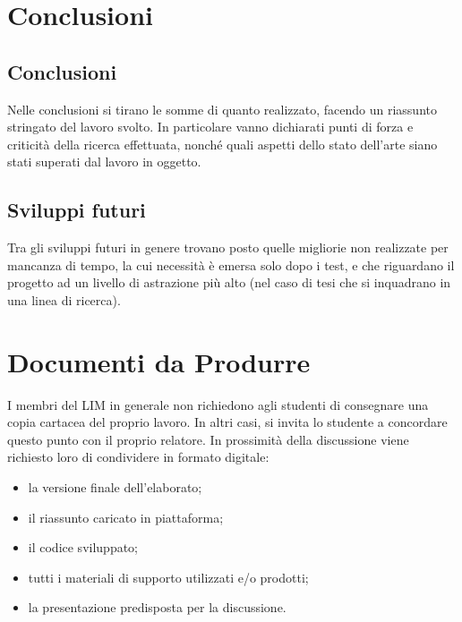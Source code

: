 \documentclass[12pt]{report}
\begin{document}
    \chapter{Conclusioni}
    \label{cap6}


    \section{Conclusioni}

    Nelle conclusioni si tirano le somme di quanto realizzato, facendo un riassunto stringato del lavoro svolto. In particolare vanno dichiarati punti di forza e criticità della ricerca effettuata, nonché quali aspetti dello stato dell'arte siano stati superati dal lavoro in oggetto.


    \section{Sviluppi futuri}

    Tra gli sviluppi futuri in genere trovano posto quelle migliorie non realizzate per mancanza di tempo, la cui necessità è emersa solo dopo i test, e che riguardano il progetto ad un livello di astrazione più alto (nel caso di tesi che si inquadrano in una linea di ricerca).


%
%

    \appendix


    \chapter{Documenti da Produrre}
    I membri del LIM in generale non richiedono agli studenti di consegnare una copia cartacea del proprio lavoro. In altri casi, si invita lo studente a concordare questo punto con il proprio relatore.
    In prossimità della discussione viene richiesto loro di condividere in formato digitale:
    \begin{itemize}
        \item la versione finale dell'elaborato;
        \item il riassunto caricato in piattaforma;
        \item il codice sviluppato;
        \item tutti i materiali di supporto utilizzati e/o prodotti;
        \item la presentazione predisposta per la discussione.
    \end{itemize}
\end{document}
